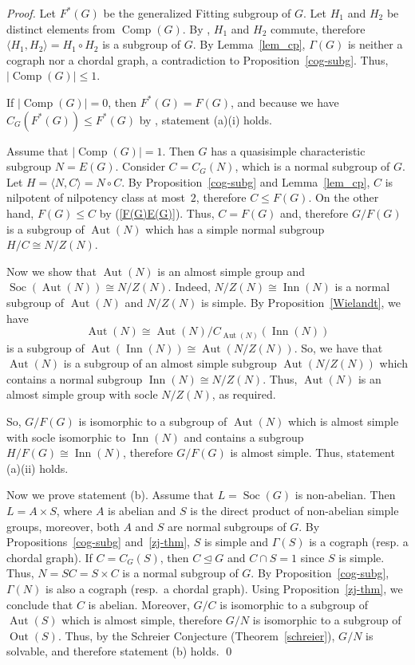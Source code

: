 \documentclass{elsarticle}
\newcommand{\Aut}{\mathop{\mathrm{Aut}}}
\newcommand{\Inn}{\mathop{\mathrm{Inn}}}
\newcommand{\Soc}{\mathop{\mathrm{Soc}}}
\newcommand{\Out}{\mathop{\mathrm{Out}}}
\newcommand{\Comp}{\mathop{\mathrm{Comp}}}
\begin{document}
\begin{proof} Let $F^*(G)$ be the generalized Fitting subgroup of $G$.
Let $H_1$ and $H_2$ be distinct elements from $\Comp(G)$. By \cite[31.5]{Asch86}, $H_1$ and $H_2$ commute, therefore $\langle H_1, H_2 \rangle = H_1 \circ H_2$ is a subgroup of $G$. By Lemma~\ref{lem_cp}, $\Gamma(G)$ is neither a cograph nor a chordal graph, a contradiction to Proposition~\ref{cog-subg}. Thus, $|\Comp(G)| \le 1$.

If $|\Comp(G)|=0$, then $F^*(G)=F(G)$, and because we have $C_G(F^*(G))\le F^*(G)$ by \cite[31.13]{Asch86}, statement (a)(i) holds.

Assume that $|\Comp(G)|=1$. Then $G$ has a quasisimple characteristic subgroup $N=E(G)$. Consider $C=C_G(N)$, which is a normal subgroup of $G$. Let $H = \langle N ,C \rangle = N \circ C$. By Proposition~\ref{cog-subg} and Lemma~\ref{lem_cp}, $C$ is nilpotent of nilpotency class at most~$2$, therefore $C \le F(G)$.
On the other hand, $F(G) \le C$ by (\ref{F(G)E(G)}). Thus, $C=F(G)$ and, therefore $G/F(G)$ is a subgroup of $\Aut(N)$ which has a simple normal subgroup $H/C \cong N/Z(N)$.

Now we show that $\Aut(N)$ is an almost simple group and $\Soc(\Aut(N))\cong N/Z(N)$. Indeed, $N/Z(N)\cong\Inn(N)$ is a normal subgroup of $\Aut(N)$ and $N/Z(N)$ is simple. By Proposition~\ref{Wielandt}, we have $$\Aut(N) \cong\Aut(N)/C_{\Aut(N)}(\Inn(N))$$ is a subgroup of $\Aut(\Inn(N))\cong \Aut(N/Z(N))$. So, we have that $\Aut(N)$ is a subgroup of an almost simple subgroup $\Aut(N/Z(N))$ which contains a normal subgroup $\Inn(N)\cong N/Z(N)$. Thus, $\Aut(N)$ is an almost simple group with socle $N/Z(N)$, as required.

So, $G/F(G)$ is isomorphic to a subgroup of $\Aut(N)$ which is almost simple with socle isomorphic to $\Inn(N)$ and contains a subgroup $H/F(G) \cong\Inn(N)$, therefore $G/F(G)$ is almost simple. Thus, statement (a)(ii) holds.

\smallskip

Now we prove statement (b). Assume that $L=\Soc(G)$ is non-abelian. Then $L=A\times S$, where $A$ is abelian and $S$ is the direct product of non-abelian simple groups, moreover, both $A$ and $S$ are normal subgroups of $G$. By Propositions~\ref{cog-subg} and~\ref{zj-thm}, $S$ is simple and $\Gamma(S)$ is a cograph {\rm(}resp. a chordal graph{\rm)}. If $C=C_G(S)$, then $C \unlhd G$ and $C \cap S =1$ since $S$ is simple.
Thus, $N=SC=S \times C$ is a normal subgroup of $G$. By Proposition~\ref{cog-subg}, $\Gamma(N)$ is also a cograph (resp.\ a chordal graph). Using Proposition~\ref{zj-thm}, we conclude that $C$ is abelian.
Moreover, $G/C$ is isomorphic to a subgroup of  $\Aut(S)$ which is almost simple, therefore $G/N$ is isomorphic to a subgroup of $\Out(S)$. Thus, by the Schreier Conjecture (Theorem~\ref{schreier}), $G/N$ is solvable, and therefore statement (b) holds. \qed
\end{proof}
\end{document}
